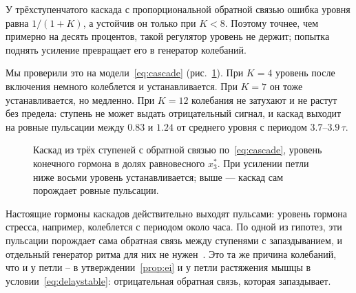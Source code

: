 \begin{keyblock}
\begin{proposition}
\label{prop:cascade}
У трёхступенчатого каскада с пропорциональной обратной связью ошибка уровня равна $1/(1+K)$, а устойчив он только при $K<8$. Поэтому точнее, чем примерно на десять процентов, такой регулятор уровень не держит; попытка поднять усиление превращает его в генератор колебаний.
\end{proposition}
\end{keyblock}

Мы проверили это на модели~\eqref{eq:cascade} (рис.~\ref{fig:cascade}). При $K=4$ уровень после включения немного колеблется и устанавливается. При $K=7$ он тоже устанавливается, но медленно. При $K=12$ колебания не затухают и не растут без предела: ступень не может выдать отрицательный сигнал, и каскад выходит на ровные пульсации между $0.83$ и $1.24$ от среднего уровня с периодом $3.7$--$3.9\,\tau$.

\begin{figure}[t]
\centering
{}
\caption{Каскад из трёх ступеней с обратной связью по~\eqref{eq:cascade}, уровень конечного гормона в долях равновесного $x_3^*$. При усилении петли ниже восьми уровень устанавливается; выше --- каскад сам порождает ровные пульсации.}
\label{fig:cascade}
\end{figure}

Настоящие гормоны каскадов действительно выходят пульсами: уровень гормона стресса, например, колеблется с периодом около часа. По одной из гипотез, эти пульсации порождает сама обратная связь между ступенями с запаздыванием, и отдельный генератор ритма для них не нужен~\cite{Walker2010}. Это та же причина колебаний, что и у петли -- в утверждении~\ref{prop:ei} и у петли растяжения мышцы в условии~\eqref{eq:delaystable}: отрицательная обратная связь, которая запаздывает.

